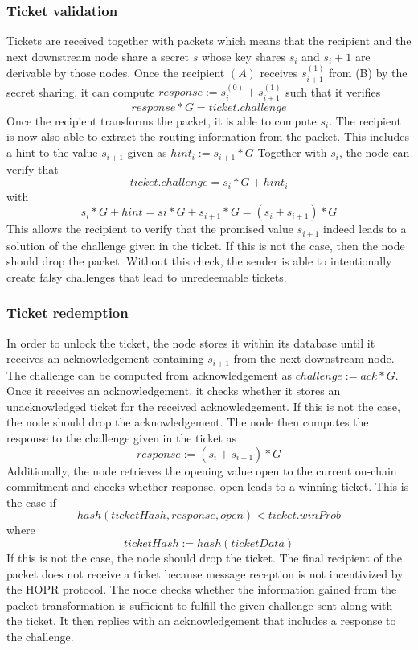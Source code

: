 \subsubsection{Ticket validation}
Tickets are received together with packets which means that the recipient and the next downstream node share a secret $s$ whose key shares $s_i$ and $s_i+1$ are derivable by those nodes.
\newline Once the recipient $(A)$ receives $s_{i+1}^{(1)}$ from (B) by the secret sharing, it can compute $response:=s_i^{(0)}+s_{i+1}^{(1)}$ such that it verifies  
$$response*G=ticket.challenge$$
Once the recipient transforms the packet, it is able to compute $s_i$. The recipient is now also able to extract the routing information from the packet. 
This includes a hint to the value $s_{i+1}$ given as $hint_i:=s_{i+1}*G$ 
\newline Together with $s_i$, the node can verify that $$ticket.challenge=s_i*G+hint_i$$ with $$s_i*G+hint=si*G+s_{i+1}*G=(s_i+s_{i+1})*G$$ 
This allows the recipient to verify that the promised value $s_{i+1}$ indeed leads to a solution of the challenge given in the ticket. 
If this is not the case, then the node should drop the packet.
\newline Without this check, the sender is able to intentionally create falsy challenges that lead to unredeemable tickets.


\subsubsection{Ticket redemption}
In order to unlock the ticket, the node stores it within its database until it receives an acknowledgement containing $s_{i+1}$ from the next downstream node. 
The challenge can be computed from acknowledgement as $challenge:=ack*G$.
\newline Once it receives an acknowledgement, it checks whether it stores an unacknowledged ticket for the received acknowledgement. 
If this is not the case, the node should drop the acknowledgement.  
\newline The node then computes the response to the challenge given in the ticket as $$response:=(s_i+s_{i+1})*G$$
Additionally, the node retrieves the opening value open to the current on-chain commitment and checks whether response, open leads to a winning ticket. 
This is the case if $$hash( ticketHash, response, open ) <ticket.winProb$$ where $$ticketHash:=hash( ticketData )$$
If this is not the case, the node should drop the ticket. 
The final recipient of the packet does not receive a ticket because message reception is not incentivized by the HOPR protocol.
\newline The node checks whether the information gained from the packet transformation is sufficient to fulfill the given challenge sent along with the ticket. It then replies with an acknowledgement that includes a response to the challenge.








